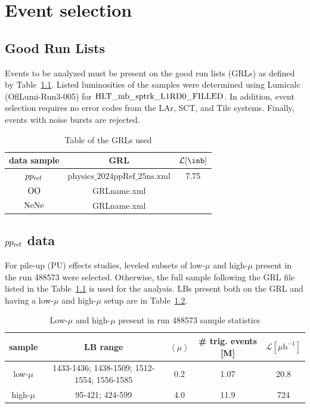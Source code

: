 \chapter{Event selection}\label{chap:event_sel}
\section{Good Run Lists}
Events to be analyzed must be present on the good run lists (GRLs) as defined by Table~\ref{tab:GRLs}. Listed luminosities of the samples were determined using Lumicalc (OflLumi-Run3-005) for $\text{HLT\_mb\_sptrk\_L1RD0\_FILLED}$. In addition, event selection requires no error codes from the LAr, SCT, and Tile systems. Finally, events with noise bursts are rejected.

\begin{table}[!h]
\begin{center}
\begin{tabular}{c|c|c}
data sample & GRL & $\mathcal{L} [\inb]$ \\ \hline
$pp_{\mathrm{ref}}$  & $\mathrm{physics\_2024ppRef\_25ns.xml}$ & 7.75 \\
$\text{OO}$  & GRLname.xml \\

$\text{NeNe}$  & GRLname.xml \\
\end{tabular}
\end{center}
\caption{Table of the GRLs used}
\label{tab:GRLs}
\end{table}


\section{$pp_{\mathrm{ref}}$ data}

For pile-up (PU) effects studies, leveled subsets of low-$\mu$ and high-$\mu$ present in the run 488573 were selected. Otherwise, the full sample following the GRL file listed in the Table~\ref{tab:GRLs} is used for the analysis. LBs present both on the GRL and having a low-$\mu$ and high-$\mu$ setup are in Table~\ref{tab:PU_samples}.

\begin{table}[!h]
\begin{center}
\begin{tabular}{c|c|c|c|c}
sample & LB range & $\left\langle \mu \right\rangle$ & \# trig. events [M] & $\mathcal{L} [\mu \mathrm{b^{-1}}]$  \\ \hline
low-$\mu$ & 1433-1436; 1438-1509; 1512-1554; 1556-1585 & 0.2 & 1.07  & 20.8 \\
high-$\mu$ & 95-421; 424-599 & 4.0 & 11.9 &  724  \\
\end{tabular}
\end{center}
\caption{Low-$\mu$ and high-$\mu$ present in run 488573 sample statistics}
\label{tab:PU_samples}
\end{table}

